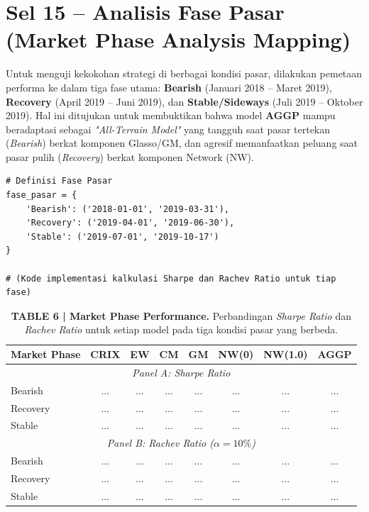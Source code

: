 \documentclass[12pt,a4paper]{article}
\begin{document}
\section{Sel 15 -- Analisis Fase Pasar (Market Phase Analysis Mapping)}
Untuk menguji kekokohan strategi di berbagai kondisi pasar, dilakukan pemetaan performa ke dalam tiga fase utama: \textbf{Bearish} (Januari 2018 -- Maret 2019), \textbf{Recovery} (April 2019 -- Juni 2019), dan \textbf{Stable/Sideways} (Juli 2019 -- Oktober 2019). Hal ini ditujukan untuk membuktikan bahwa model \textbf{AGGP} mampu beradaptasi sebagai \textit{"All-Terrain Model"} yang tangguh saat pasar tertekan (\textit{Bearish}) berkat komponen Glasso/GM, dan agresif memanfaatkan peluang saat pasar pulih (\textit{Recovery}) berkat komponen Network (NW).

\begin{lstlisting}[caption={Kalkulasi Metrik Berdasarkan Fase Pasar}]
# Definisi Fase Pasar
fase_pasar = {
    'Bearish': ('2018-01-01', '2019-03-31'),
    'Recovery': ('2019-04-01', '2019-06-30'),
    'Stable': ('2019-07-01', '2019-10-17')
}

# (Kode implementasi kalkulasi Sharpe dan Rachev Ratio untuk tiap fase)
\end{lstlisting}

\begin{table}[h]
    \centering
    \footnotesize
    \caption{\textbf{TABLE 6 | Market Phase Performance.} Perbandingan \textit{Sharpe Ratio} dan \textit{Rachev Ratio} untuk setiap model pada tiga kondisi pasar yang berbeda.}
    \begin{tabular}{lccccccc}
        \toprule
        Market Phase & CRIX & EW & CM & GM & NW(0) & NW(1.0) & AGGP \\
        \midrule
        \multicolumn{8}{c}{\textit{Panel A: Sharpe Ratio}} \\
        Bearish  & ... & ... & ... & ... & ... & ... & ... \\
        Recovery & ... & ... & ... & ... & ... & ... & ... \\
        Stable   & ... & ... & ... & ... & ... & ... & ... \\
        \midrule
        \multicolumn{8}{c}{\textit{Panel B: Rachev Ratio ($\alpha=10\%$)}} \\
        Bearish  & ... & ... & ... & ... & ... & ... & ... \\
        Recovery & ... & ... & ... & ... & ... & ... & ... \\
        Stable   & ... & ... & ... & ... & ... & ... & ... \\
        \bottomrule
    \end{tabular}
\end{table}
\end{document}
